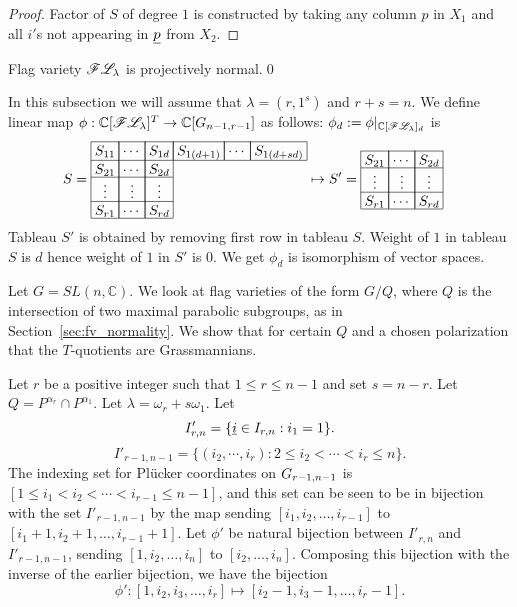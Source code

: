 {\begin{proof}
    Factor of \(S\) of degree \(1\) is constructed by taking any column \(p\) in \(X_1\) 
    and all \(i'\)s not appearing in \(\underline{p}\) from \(X_2\).
\end{proof}
\begin{corollary}
    Flag variety \(\mathscr{F}\mathscr{L}_{\lambda}\) is projectively normal.\qed
\end{corollary}
In this subsection we will assume that \(\lambda = (r,1^s)\) and \(r+s=n\). 
We define linear map \(\phi:\mathbb{C}[\mathscr{F}\mathscr{L}_{\lambda}]^T \to \mathbb{C}[G_{{n-1},{r-1}}]\) as follows: \(\phi_d := \phi|_{\mathbb{C}[\mathscr{F}\mathscr{L}_{\lambda}]_d}\) is
\begin{align*}
    S=
    \begin{array}[c]{*{6}c}\cline{1-6}
        \lr{S_{11}}&\lr{\cdots}&\lr{S_{1d}}&\lr{S_{1(d+1)}}&\lr{\cdots}&\lr{S_{1(d+sd)}}\\\cline{1-6}
        \lr{S_{21}}&\lr{\cdots}&\lr{S_{2d}}\\\cline{1-3}
        \lr{\vdots}&\lr{\vdots}&\lr{\vdots}\\\cline{1-3}
        \lr{S_{r1}}&\lr{\cdots}&\lr{S_{rd}}\\\cline{1-3}
    \end{array}
    &\mapsto S'=
    \begin{array}[c]{*{3}c}\cline{1-3}
        \lr{S_{21}}&\lr{\cdots}&\lr{S_{2d}}\\\cline{1-3}
        \lr{\vdots}&\lr{\vdots}&\lr{\vdots}\\\cline{1-3}
        \lr{S_{r1}}&\lr{\cdots}&\lr{S_{rd}}\\\cline{1-3}
    \end{array}
\end{align*}
Tableau \(S'\) is obtained by removing first row in tableau \(S\). Weight of \(1\) in tableau \(S\) is \(d\) hence weight of \(1\) in \(S'\) is \(0\). We get \(\phi_d\) is isomorphism of vector spaces. 
}
Let $G=SL(n,{\mathbb C})$. We look at flag varieties of the form $G/Q$, where $Q$ is the intersection of two maximal parabolic subgroups, as in Section~\ref{sec:fv_normality}. 
We show that for certain $Q$ and a chosen polarization that the $T$-quotients are Grassmannians.
 
Let $r$ be a positive integer such that $1 \leq r \leq n-1$ and set $s = n-r$.  Let  $Q = P^{\alpha_r} \cap P^{\alpha_1}$. Let $\lambda = \omega_r + s\omega_1$.
Let \[I'_{r,n} = \{{\underline i} \in I_{r,n} : i_1 = 1\}.\]
\[I'_{r-1,n-1} = \{(i_2,\cdots,i_r):2 \le i_2 < \cdots < i_r \le n\}.\]
The indexing set for  Pl\"{u}cker coordinates on \(G_{{r-1},{n-1}}\) is $[1 \leq i_1 < i_2 < \cdots < i_{r-1} \leq n-1]$, and this set can be seen to be in bijection with the set $I'_{r-1,n-1}$ by the map sending 
$[i_1,i_2,\ldots,i_{r-1}]$ to $[i_1 + 1, i_2 + 1,\ldots, i_{r-1}+1]$.  Let \(\phi'\) be natural bijection between \(I'_{r,n}\) and \(I'_{r-1,n-1}\), sending $[1, i_2,\ldots,i_n]$ to $[i_2,\ldots,i_n]$.
Composing this bijection with the inverse of the earlier bijection, we have the bijection
$$\phi':[1, i_2,i_3,\ldots, i_r] \mapsto [i_2-1,i_3-1,\ldots,i_r - 1].$$

